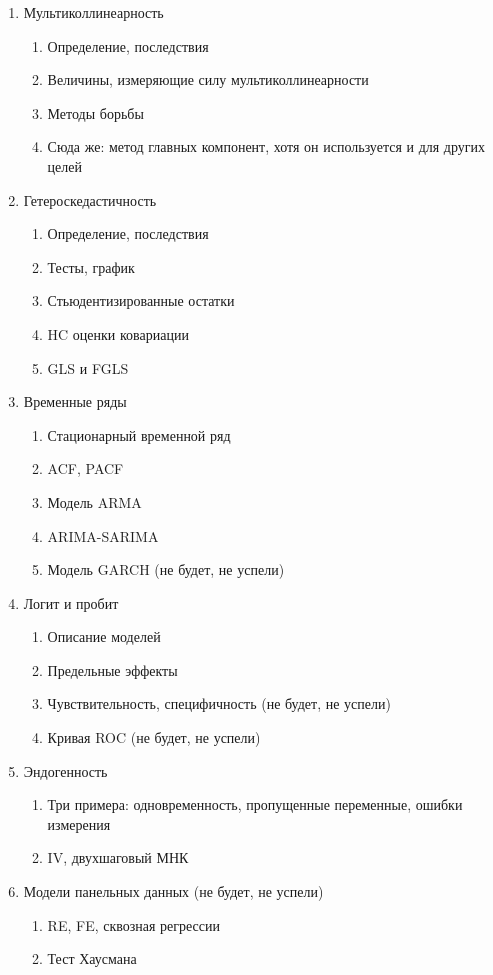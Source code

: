 \documentclass[12pt, a4paper]{article}\usepackage[]{graphicx}\usepackage[]{color}
\begin{document}
\begin{enumerate}
\item Мультиколлинеарность
\begin{enumerate}
\item Определение, последствия
\item Величины, измеряющие силу мультиколлинеарности
\item Методы борьбы
\item Сюда же: метод главных компонент, хотя он используется и для других целей
\end{enumerate}


\item Гетероскедастичность
\begin{enumerate}
\item Определение, последствия
\item Тесты, график
\item Стьюдентизированные остатки
\item HC оценки ковариации
\item GLS и FGLS
\end{enumerate}

\item Временные ряды
\begin{enumerate}
\item Стационарный временной ряд
\item ACF, PACF
\item Модель ARMA
\item ARIMA-SARIMA
\item Модель GARCH (не будет, не успели)
\end{enumerate}


\item Логит и пробит
\begin{enumerate}
\item Описание моделей
\item Предельные эффекты
\item Чувствительность, специфичность (не будет, не успели)
\item Кривая ROC (не будет, не успели)
\end{enumerate}

\item Эндогенность
\begin{enumerate}
\item Три примера: одновременность, пропущенные переменные, ошибки измерения
\item IV, двухшаговый МНК
\end{enumerate}


\item Модели панельных данных (не будет, не успели)
\begin{enumerate}
\item  RE, FE, сквозная регрессии
\item  Тест Хаусмана
\end{enumerate}


\end{enumerate}
\end{document}
